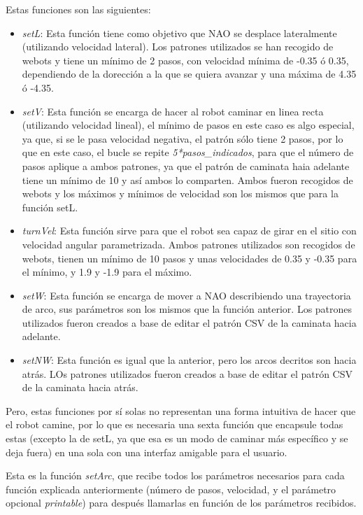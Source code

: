 Estas funciones son las siguientes:
\begin{itemize}
    \item \textit{setL}: Esta función tiene como objetivo que NAO se desplace lateralmente (utilizando velocidad lateral). Los patrones utilizados se han recogido de webots y tiene un mínimo de 2 pasos, con velocidad mínima de -0.35 ó 0.35, dependiendo de la dorección a la que se quiera avanzar y una máxima de 4.35 ó -4.35. 
    \item \textit{setV}: Esta función se encarga de hacer al robot caminar en linea recta (utilizando velocidad lineal), el mínimo de pasos en este caso es algo especial, ya que, si se le pasa velocidad negativa, el patrón sólo tiene 2 pasos, por lo que en este caso, el bucle se repite \textit{5*pasos\_indicados}, para que el número de pasos aplique a ambos patrones, ya que el patrón de caminata haia adelante tiene un mínimo de 10 y así ambos lo comparten. Ambos fueron recogidos de webots y los máximos y mínimos de velocidad son los mismos que para la función setL.
    \item \textit{turnVel}: Esta función sirve para que el robot sea capaz de girar en el sitio con velocidad angular parametrizada. Ambos patrones utilizados son recogidos de webots, tienen un mínimo de 10 pasos y unas velocidades de 0.35 y -0.35 para el mínimo, y 1.9 y -1.9 para el máximo.
    \item \textit{setW}: Esta función se encarga de mover a NAO describiendo una trayectoria de arco, sus parámetros son los mismos que la función anterior. Los patrones utilizados fueron creados a base de editar el patrón CSV de la caminata hacia adelante.
    \item \textit{setNW}: Esta función es igual que la anterior, pero los arcos decritos son hacia atrás. LOs patrones utilizados fueron creados a base de editar el patrón CSV de la caminata hacia atrás.
\end{itemize}

Pero, estas funciones por sí solas no representan una forma intuitiva de hacer que el robot camine, por lo que es necesaria una sexta función que encapsule todas estas (excepto la de setL, ya que esa es un modo de caminar más específico y se deja fuera) en una sola con una interfaz amigable para el usuario.

Esta es la función \textit{setArc}, que recibe todos los parámetros necesarios para cada función explicada anteriormente (número de pasos, velocidad, y el parámetro opcional \textit{printable}) para después llamarlas en función de los parámetros recibidos.

